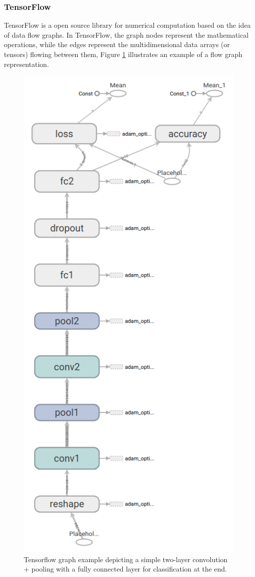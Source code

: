\subsubsection{TensorFlow}
TensorFlow is a open source library for numerical computation based on the idea of data flow graphs. In TensorFlow, the graph nodes represent the mathematical operations, while the edges represent the multidimensional data arrays (or tensors) flowing between them, Figure \ref{fig:tensorflow} illustrates an example of a flow graph representation.

\begin{figure}[h]
	\includegraphics[scale=0.3]{archivos/tensorflow.png}
	\centering
	\caption{Tensorflow graph example depicting a simple two-layer convolution + pooling with a fully connected layer for classification at the end.}
	\label{fig:tensorflow}
\end{figure}

